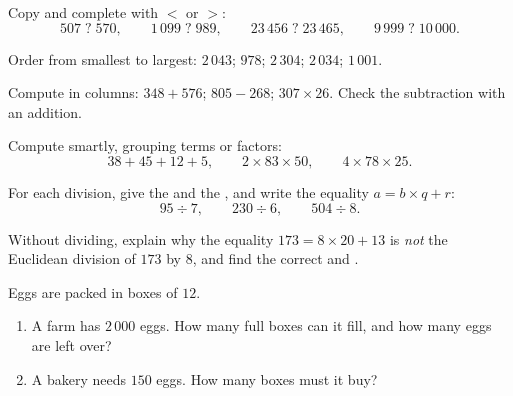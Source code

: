 \begin{exercise}[$\star$]\label{exo:g6:wholes:3}
Copy and complete with $<$ or $>$:
\[
507 \;?\; 570, \qquad
1\,099 \;?\; 989, \qquad
23\,456 \;?\; 23\,465, \qquad
9\,999 \;?\; 10\,000 .
\]
\end{exercise}

\begin{exercise}[$\star$]\label{exo:g6:wholes:4}
Order from smallest to largest: $2\,043$; $978$; $2\,304$; $2\,034$;
$1\,001$.
\end{exercise}

\begin{exercise}[$\star$]\label{exo:g6:wholes:5}
Compute in columns: $348 + 576$; \quad $805 - 268$; \quad
$307 \times 26$. Check the subtraction with an addition.
\end{exercise}

\begin{exercise}[$\star$]\label{exo:g6:wholes:6}
Compute smartly, grouping terms or factors:
\[
38 + 45 + 12 + 5, \qquad
2 \times 83 \times 50, \qquad
4 \times 78 \times 25 .
\]
\end{exercise}

\begin{exercise}[$\star$]\label{exo:g6:wholes:7}
For each division, give the  and the , and write the
equality $a = b \times q + r$:
\[
95 \div 7, \qquad
230 \div 6, \qquad
504 \div 8 .
\]
\end{exercise}

\begin{exercise}[$\star$]\label{exo:g6:wholes:8}
Without dividing, explain why the equality $173 = 8 \times 20 + 13$ is
\emph{not} the Euclidean division of $173$ by $8$, and find the correct
 and .
\end{exercise}

\begin{exercise}[$\star\star$]\label{exo:g6:wholes:9}
Eggs are packed in boxes of $12$.
\begin{enumerate}
  \item A farm has $2\,000$ eggs. How many full boxes can it fill, and
        how many eggs are left over?
  \item A bakery needs $150$ eggs. How many boxes must it buy?
\end{enumerate}
\end{exercise}

